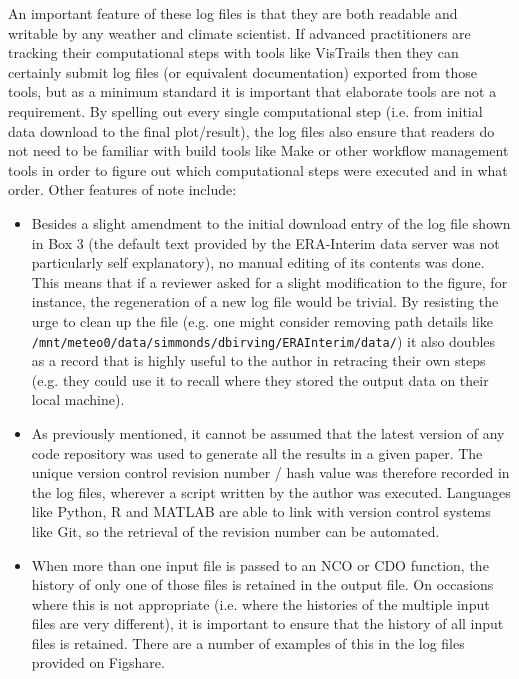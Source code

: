 An important feature of these log files is that they are both readable and writable by any weather and climate scientist. If advanced practitioners are tracking their computational steps with tools like VisTrails then they can certainly submit log files (or equivalent documentation) exported from those tools, but as a minimum standard it is important that elaborate tools are not a requirement. By spelling out every single computational step (i.e. from initial data download to the final plot/result), the log files also ensure that readers do not need to be familiar with build tools like Make or other workflow management tools in order to figure out which computational steps were executed and in what order. Other features of note include:
\begin{itemize}
\item Besides a slight amendment to the initial download entry of the log file shown in Box 3 (the default text provided by the ERA-Interim data server was not particularly self explanatory), no manual editing of its contents was done. This means that if a reviewer asked for a slight modification to the figure, for instance, the regeneration of a new log file would be trivial. By resisting the urge to clean up the file (e.g. one might consider removing path details like \verb|/mnt/meteo0/data/simmonds/dbirving/ERAInterim/data/|) it also doubles as a record that is highly useful to the author in retracing their own steps (e.g. they could use it to recall where they stored the output data on their local machine).
\item As previously mentioned, it cannot be assumed that the latest version of any code repository was used to generate all the results in a given paper. The unique version control revision number / hash value was therefore recorded in the log files, wherever a script written by the author was executed. Languages like Python, R and MATLAB are able to link with version control systems like Git, so the retrieval of the revision number can be automated.
\item When more than one input file is passed to an NCO or CDO function, the history of only one of those files is retained in the output file. On occasions where this is not appropriate (i.e. where the histories of the multiple input files are very different), it is important to ensure that the history of all input files is retained. There are a number of examples of this in the log files provided on Figshare. 
\end{itemize}
  
 
  
  
  
  
  
  
  
  
  
  
  
  
  
  
  
  
  
  
  
  
  
  
  
  
  
  
  